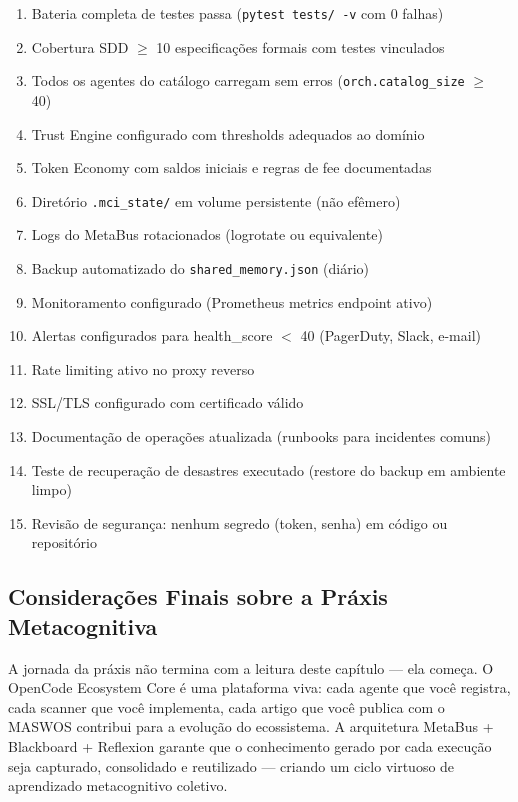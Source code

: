 \begin{enumerate}
  \item [$\square$] Bateria completa de testes passa (\texttt{pytest tests/ -v} com 0 falhas)
  \item [$\square$] Cobertura SDD $\ge$ 10 especificações formais com testes vinculados
  \item [$\square$] Todos os agentes do catálogo carregam sem erros (\texttt{orch.catalog\_size} $\ge$ 40)
  \item [$\square$] Trust Engine configurado com thresholds adequados ao domínio
  \item [$\square$] Token Economy com saldos iniciais e regras de fee documentadas
  \item [$\square$] Diretório \texttt{.mci\_state/} em volume persistente (não efêmero)
  \item [$\square$] Logs do MetaBus rotacionados (logrotate ou equivalente)
  \item [$\square$] Backup automatizado do \texttt{shared\_memory.json} (diário)
  \item [$\square$] Monitoramento configurado (Prometheus metrics endpoint ativo)
  \item [$\square$] Alertas configurados para health\_score $<$ 40 (PagerDuty, Slack, e-mail)
  \item [$\square$] Rate limiting ativo no proxy reverso
  \item [$\square$] SSL/TLS configurado com certificado válido
  \item [$\square$] Documentação de operações atualizada (runbooks para incidentes comuns)
  \item [$\square$] Teste de recuperação de desastres executado (restore do backup em ambiente limpo)
  \item [$\square$] Revisão de segurança: nenhum segredo (token, senha) em código ou repositório
\end{enumerate}

\subsection{Considerações Finais sobre a Práxis Metacognitiva}
\label{sec:consideracoes-finais-praxis}

A jornada da práxis não termina com a leitura deste capítulo — ela começa. O OpenCode Ecosystem Core é uma plataforma viva: cada agente que você registra, cada scanner que você implementa, cada artigo que você publica com o MASWOS contribui para a evolução do ecossistema. A arquitetura MetaBus + Blackboard + Reflexion garante que o conhecimento gerado por cada execução seja capturado, consolidado e reutilizado — criando um ciclo virtuoso de aprendizado metacognitivo coletivo.

